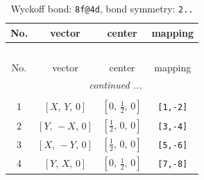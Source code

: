 \documentclass[fleqn,8pt]{jsarticle}
\begin{document}
\renewcommand{\arraystretch}{1.2}
\begin{longtable}{cccc}
\caption{Wyckoff bond: {\tt 8f@4d}, bond symmetry: {\tt 2..}}
 \\
 \hline \hline
No. & vector & center & mapping \\ \hline \endfirsthead

\multicolumn{3}{l}{\tablename\ \thetable{}} \\
 \hline \hline
No. & vector & center & mapping \\ \hline \endhead

 \hline \hline
\multicolumn{3}{r}{\footnotesize\it continued ...} \\ \endfoot

 \hline \hline
\multicolumn{3}{r}{} \\ \endlastfoot

1 & $\left[ X,\, Y,\, 0 \right]$ & $\left[ 0,\, \frac{1}{2},\, 0 \right]$ & {\tt [1,-2]} \\ \hline
2 & $\left[ Y,\, - X,\, 0 \right]$ & $\left[ \frac{1}{2},\, 0,\, 0 \right]$ & {\tt [3,-4]} \\ \hline
3 & $\left[ X,\, - Y,\, 0 \right]$ & $\left[ \frac{1}{2},\, 0,\, 0 \right]$ & {\tt [5,-6]} \\ \hline
4 & $\left[ Y,\, X,\, 0 \right]$ & $\left[ 0,\, \frac{1}{2},\, 0 \right]$ & {\tt [7,-8]} \\
\end{longtable}
\renewcommand{\arraystretch}{1.2}
\end{document}
